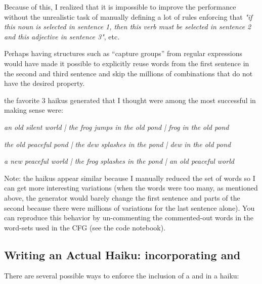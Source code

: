\begin{enumarabic}
    Because of this, I realized that it is impossible to improve the performance
    without the unrealistic task of manually defining a lot of rules enforcing
    that \emph{"if this noun is selected in sentence 1, then this verb must be selected in sentence 2
    and this adjective in sentence 3"}, etc.

    Perhaps having structures such as ``capture groups'' from regular expressions
    would have made it possible to explicitly reuse words from the first sentence
    in the second and third sentence and skip the millions of combinations that
    do not have the desired property.

  \item the favorite $3$ haikus generated that I thought were among the most successful
    in making sense were:
    \begin{enumroman}
      \item \emph{an old silent world | the frog jumps in the old pond | frog in the old pond}
      \item \emph{the old peaceful pond | the dew splashes in the pond | dew in the old pond}
      \item \emph{a new peaceful world | the frog splashes in the pond | an old peaceful world}
    \end{enumroman}
    Note: the haikus appear similar because I manually reduced the set of words so I can
    get more interesting variations (when the words were too many, as mentioned above,
    the generator would barely change the first sentence and parts of the second
    because there were millions of variations for the last sentence alone).
    You can reproduce this behavior by un-commenting the commented-out words in the
    word-sets used in the CFG (see the code notebook).
\end{enumarabic}

\subsection{Writing an Actual Haiku: incorporating  and }

There are several possible ways to enforce the inclusion
of a  and  in a haiku:

